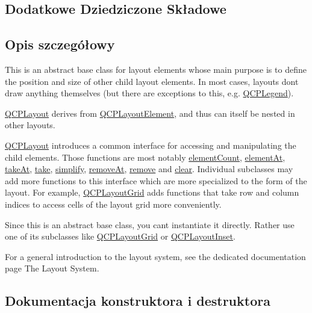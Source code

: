 \subsection*{Dodatkowe Dziedziczone Składowe}


\subsection{Opis szczegółowy}
This is an abstract base class for layout elements whose main purpose is to define the position and size of other child layout elements. In most cases, layouts don\textquotesingle{}t draw anything themselves (but there are exceptions to this, e.\+g. \hyperlink{class_q_c_p_legend}{Q\+C\+P\+Legend}).

\hyperlink{class_q_c_p_layout}{Q\+C\+P\+Layout} derives from \hyperlink{class_q_c_p_layout_element}{Q\+C\+P\+Layout\+Element}, and thus can itself be nested in other layouts.

\hyperlink{class_q_c_p_layout}{Q\+C\+P\+Layout} introduces a common interface for accessing and manipulating the child elements. Those functions are most notably \hyperlink{class_q_c_p_layout_a39d3e9ef5d9b82ab1885ba1cb9597e56}{element\+Count}, \hyperlink{class_q_c_p_layout_afa73ca7d859f8a3ee5c73c9b353d2a56}{element\+At}, \hyperlink{class_q_c_p_layout_a5a79621fa0a6eabb8b520cfc04fb601a}{take\+At}, \hyperlink{class_q_c_p_layout_ada26cd17e56472b0b4d7fbbc96873e4c}{take}, \hyperlink{class_q_c_p_layout_a41e6ac049143866e8f8b4964efab01b2}{simplify}, \hyperlink{class_q_c_p_layout_a2403f684fee3ce47132faaeed00bb066}{remove\+At}, \hyperlink{class_q_c_p_layout_a6c58f537d8086f352576ab7c5b15d0bc}{remove} and \hyperlink{class_q_c_p_layout_a02883bdf2769b5b227f0232dba1ac4ee}{clear}. Individual subclasses may add more functions to this interface which are more specialized to the form of the layout. For example, \hyperlink{class_q_c_p_layout_grid}{Q\+C\+P\+Layout\+Grid} adds functions that take row and column indices to access cells of the layout grid more conveniently.

Since this is an abstract base class, you can\textquotesingle{}t instantiate it directly. Rather use one of its subclasses like \hyperlink{class_q_c_p_layout_grid}{Q\+C\+P\+Layout\+Grid} or \hyperlink{class_q_c_p_layout_inset}{Q\+C\+P\+Layout\+Inset}.

For a general introduction to the layout system, see the dedicated documentation page The Layout System. 

\subsection{Dokumentacja konstruktora i destruktora}
